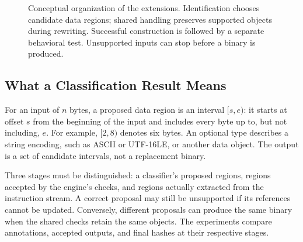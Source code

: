 \begin{figure}[t]
\centering
{}
\caption{Conceptual organization of the extensions. Identification chooses
candidate data regions; shared handling preserves supported objects during
rewriting. Successful construction is followed by a separate behavioral
test. Unsupported inputs can stop before a binary is produced.}
\label{fig:extended_pipeline}
\end{figure}

\subsection{What a Classification Result Means}
For an input of $n$ bytes, a proposed data region is an interval $[s,e)$:
it starts at offset $s$ from the beginning of the input and includes every
byte up to, but not including, $e$. For example, $[2,8)$ denotes six bytes.
An optional type describes a string encoding, such as ASCII or UTF-16LE,
or another data object. The output is a set of candidate intervals,
not a replacement binary.

Three stages must be distinguished: a classifier's proposed regions,
regions accepted by the engine's checks, and regions actually extracted
from the instruction stream. A correct proposal may still be unsupported
if its references cannot be updated. Conversely, different proposals can
produce the same binary when the shared checks retain the same objects.
The experiments compare annotations, accepted outputs, and final hashes
at their respective stages.


